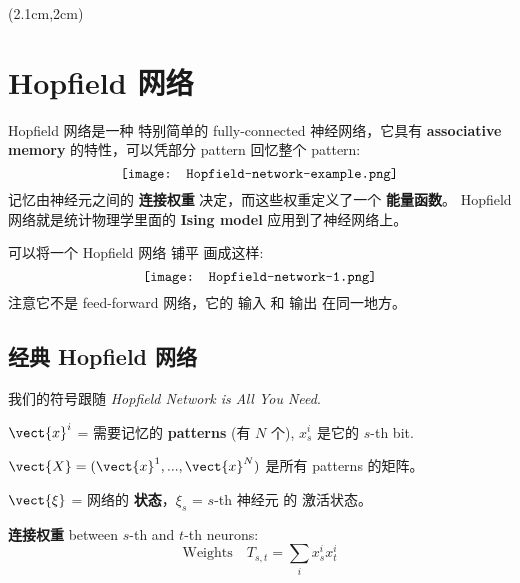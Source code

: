 \begin{preview}
\begin{minipage}{\textwidth}
\setlength{\parskip}{0.4\baselineskip}

\begin{textblock*}{20cm}(2.1cm,2cm) %
	{}
	\hspace{8cm}
\end{textblock*}
\vspace*{0.3cm} 

\section{Hopfield 网络}

Hopfield 网络是一种 特别简单的 fully-connected 神经网络，它具有 \textbf{associative memory} 的特性，可以凭部分 pattern 回忆整个 pattern:
\begin{equation}
\vcenter{\hbox{\texttt{[image: Hopfield-network-example.png]}}}
\end{equation}
记忆由神经元之间的 \textbf{连接权重} 决定，而这些权重定义了一个 \textbf{能量函数}。 Hopfield 网络就是统计物理学里面的 \textbf{Ising model} 应用到了神经网络上。 

可以将一个 Hopfield 网络 铺平 画成这样:
\begin{equation}
\vcenter{\hbox{\texttt{[image: Hopfield-network-1.png]}}}
\label{fig:Hopfield-network}
\end{equation}
注意它不是 feed-forward 网络，它的 输入 和 输出 在同一地方。

\subsection{经典 Hopfield 网络}

我们的符号跟随 \textit{Hopfield Network is All You Need}.

$\vect{x}^i$ = 需要记忆的 \textbf{patterns} (有 $N$ 个), $x^i_{s}$ 是它的 $s$-th bit.

$\vect{X} = (\vect{x}^1, ... , \vect{x}^N)$ 是所有 patterns 的矩阵。

$\vect{\xi}$ = 网络的 \textbf{状态}，$\xi_s$ = $s$-th 神经元 的 激活状态。

\textbf{连接权重} between $s$-th and $t$-th neurons:
\begin{equation}
\boxed{\mbox{Weights}} \quad T_{s,t} = \sum_i x^i_s x^i_t
\end{equation}


\end{minipage}
\end{preview}

